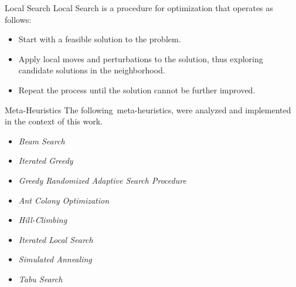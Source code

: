 \begin{frame}{Local Search}
  \alert{Local Search} is a procedure for optimization that operates as follows:

  \begin{itemize}
    \item Start with a feasible solution to the problem.
    \item Apply local moves and perturbations to the solution, thus exploring candidate solutions in the neighborhood.
    \item Repeat the process until the solution cannot be further improved.
  \end{itemize}

  \begin{center}
  \end{center}
\end{frame}

\begin{frame}{Meta-Heuristics}
  The following~\alert{meta-heuristics}, were analyzed and implemented in the context
  of this work.
  \begin{itemize}
    \item \emph{Beam Search}
    \item \emph{Iterated Greedy}
    \item \emph{Greedy Randomized Adaptive Search Procedure}
    \item \emph{Ant Colony Optimization}
    \item \emph{Hill-Climbing}
    \item \emph{Iterated Local Search}
    \item \emph{Simulated Annealing}
    \item \emph{Tabu Search}
  \end{itemize}

\end{frame}